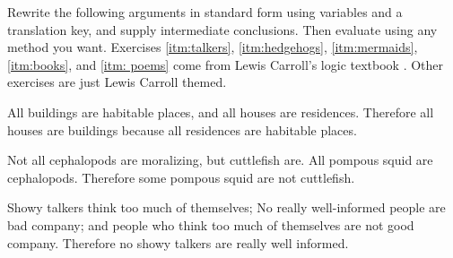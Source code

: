 \noindent\problempart Rewrite the following arguments in standard form using variables and a translation key, and supply intermediate conclusions. Then evaluate using any method you want. Exercises \ref{itm:talkers}, \ref{itm:hedgehogs}, \ref{itm:mermaids}, \ref{itm:books}, and \ref{itm: poems} come from Lewis Carroll's logic textbook \citep{Dodgson1896}. Other exercises are just Lewis Carroll themed.

\begin{exercises}

\item All buildings are habitable places, and all houses are residences. Therefore all houses are buildings because all residences are habitable places. 



\item Not all cephalopods are moralizing, but cuttlefish are. All pompous squid are cephalopods. Therefore some pompous squid are not cuttlefish. 

%



\item \label{itm:talkers} Showy talkers think too much of themselves; No really well-informed people are bad company; and people who think too much of themselves are not good company. Therefore no showy talkers are really well informed. %




\end{exercises}
